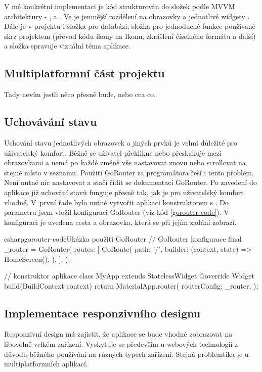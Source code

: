 \documentclass[
  biblatex,
  figures=true,
  tables=false,
  glossaries,
  index
]{kidiplom}
\begin{document}
V mé konkrétní implementaci je kód strukturován do složek podle MVVM architektury - ,  a . Ve  je jemnější rozdělení na obrazovky  a jednotlivé widgety . Dále je v projektu i složka  pro databázi, složka  pro jednoduché funkce používané skrz projektem (převod kódu ikony na Ikonu, zkrášlení číselného formátu a další) a složka  spravuje vizuální téma aplikace.

\subsection{Multiplatformní část projektu}
Tady nevím jestli něco přesně bude, nebo cca co.

\subsection{Uchovávání stavu}
Uchování stavu jednotlivých obrazovek a jiných prvků je velmi důležité pro uživatelský komfort. Běžně se uživatel překlikne nebo přeskakuje mezi obrazovkami a nemá po každé změně vše nastavovat znovu nebo scrollovat na stejné místo v seznamu. Použití GoRouter za programátora řeší i tento problém. Není nutné nic nastavovat a stačí řídit se dokumentací GoRouter. Po zavedení do aplikace již uchování stavů funguje přesně tak, jak je pro uživatelský komfort vhodné. V~první řade bylo nutné vytvořit aplikaci konstruktorem s . Do parametru  jsem vložil konfiguraci GoRouter (viz kód \ref{gorouter-code}). V konfiguraci je uvedena cesta a obrazovka, která se při jejím zadání zobrazí.

\begin{kicode}{csharp}{gorouter-code}{Ukázka použití GoRouter}
  // GoRouter konfigurace
  final _router = GoRouter(
    routes: [
      GoRoute(
        path: '/',
        builder: (context, state) => HomeScreen(),
      ),
    ],
  );

  // konstruktor aplikace
  class MyApp extends StatelessWidget {
    @override
    Widget build(BuildContext context) {
      return MaterialApp.router(
        routerConfig: _router,
      );
    }
  }
\end{kicode}

\subsection{Implementace responzivního designu}
Responzivní design má zajistit, že aplikace se bude vhodně zobrazovat na libovolně velkém zařízení. Vyskytuje se především u webových technologií z důvodu běžného používání na různých typech zařízení. Stejná problemtika je u multiplatformních aplikací.
\end{document}
